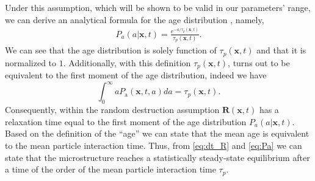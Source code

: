 Under this assumption, which will be shown to be valid in our parameters' range, we can derive an analytical formula for the age distribution \citep{zhang2023evolution}, namely,
\begin{align}
    P_a(a|\textbf{x},t)  
    =\frac{e^{-a/\tau_p(\textbf{x},t)}}{\tau_p(\textbf{x},t)}.
    \label{eq:Pa}
\end{align} 
We can see that the age distribution is solely function of $\tau_p(\textbf{x},t)$ and that it is normalized to $1$.
Additionally, with this definition $\tau_p(\textbf{x},t)$, turns out to be equivalent to the first moment of the age distribution, indeed we have 
\begin{equation*}
    \int_{0}^\infty
    a P_\text{a}(\textbf{x},t,a)
    da
    =\tau_p(\textbf{x},t). 
\end{equation*}
Consequently, within the random destruction assumption $\textbf{R}(\textbf{x},t)$ has a relaxation time equal to the first moment of the age distribution $P_a(a|\textbf{x},t)$. 
Based on the definition of the ``age'' we can state that the mean age is equivalent to the mean particle interaction time.  
Thus, from \ref{eq:dt_R} and \ref{eq:Pa} we can state that the microstructure reaches a statistically steady-state equilibrium after a time of the order of the mean particle interaction time $\tau_p$. 

